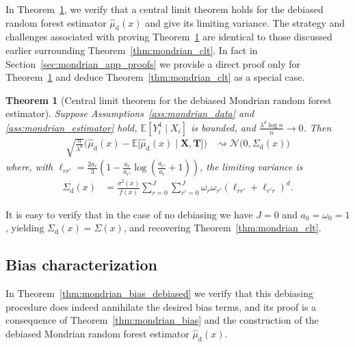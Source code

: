 \documentclass[11pt,lof]{puthesis}
\newcommand{\E}{\ensuremath{\mathbb{E}}}
\newcommand{\rd}{\ensuremath{\mathrm{d}}}
\newcommand{\bX}{\ensuremath{\mathbf{X}}}
\newcommand{\bT}{\ensuremath{\mathbf{T}}}
\newcommand{\cN}{\ensuremath{\mathcal{N}}}
\theoremstyle{break}
\newtheorem{theorem}{Theorem}[section]
\theoremstyle{proof}
\begin{document}
In Theorem~\ref{thm:mondrian_clt_debiased}, we verify that a central
limit theorem holds for the debiased
random forest estimator $\hat\mu_\rd(x)$ and give its limiting variance.
The strategy and challenges associated with proving
Theorem~\ref{thm:mondrian_clt_debiased} are identical to those discussed earlier
surrounding Theorem~\ref{thm:mondrian_clt}. In fact in
Section~\ref{sec:mondrian_app_proofs}
we provide a direct proof only for Theorem~\ref{thm:mondrian_clt_debiased}
and deduce Theorem~\ref{thm:mondrian_clt} as a special case.

\begin{theorem}[Central limit theorem for the
  debiased Mondrian random forest estimator]%
  \label{thm:mondrian_clt_debiased}
  Suppose Assumptions~\ref{ass:mondrian_data} and \ref{ass:mondrian_estimator}
  hold,
  $\E[Y_i^4 \mid X_i ]$ is bounded,
  and $\frac{\lambda^d \log n}{n} \to 0$. Then
  \begin{align*}
    \sqrt{\frac{n}{\lambda^d}}
    \Big(
      \hat \mu_\rd(x)
      - \E \big[ \hat \mu_\rd(x) \mid \bX, \bT \big]
    \Big)
    &\rightsquigarrow
    \cN\big(0, \Sigma_\rd(x)\big)
  \end{align*}
  where, with $\ell_{r r'} = \frac{2 a_r}{3} \left( 1 - \frac{a_{r}}{a_{r'}}
  \log\left(\frac{a_{r'}}{a_{r}} + 1\right) \right)$,
  the limiting variance is
  \begin{align*}
    \Sigma_\rd(x)
    &=
    \frac{\sigma^2(x)}{f(x)}
    \sum_{r=0}^{J} \sum_{r'=0}^{J} \omega_r \omega_{r'}
    \left( \ell_{r r'} + \ell_{r' r} \right)^d.
  \end{align*}
\end{theorem}

It is easy to verify that in the case of no debiasing we have
$J=0$ and $a_0 = \omega_0 = 1$, yielding
$\Sigma_\rd(x) = \Sigma(x)$, and recovering Theorem~\ref{thm:mondrian_clt}.

\subsection*{Bias characterization}

In Theorem~\ref{thm:mondrian_bias_debiased} we verify that this debiasing
procedure does indeed annihilate the desired bias terms, and its proof is a
consequence of Theorem~\ref{thm:mondrian_bias} and the construction of the
debiased Mondrian random forest estimator $\hat\mu_\rd(x)$.
\end{document}

